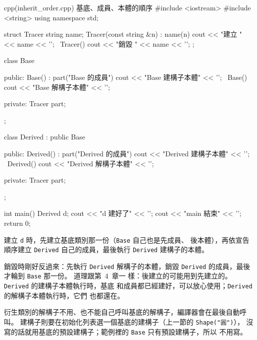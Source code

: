 \begin{example}[label=ex:inherit-order]{cpp}{(inherit\_order.cpp) 基底、成員、本體的順序}
#include <iostream>
#include <string>
using namespace std;

struct Tracer {
    string name;
    Tracer(const string &n) : name(n) { cout << "建立 " << name << '\n'; }
    ~Tracer() { cout << "銷毀 " << name << '\n'; }
};

class Base {
public:
    Base() : part("Base 的成員") { cout << "Base 建構子本體" << '\n'; }
    ~Base() { cout << "Base 解構子本體" << '\n'; }

private:
    Tracer part;
};

class Derived : public Base {
public:
    Derived() : part("Derived 的成員") { cout << "Derived 建構子本體" << '\n'; }
    ~Derived() { cout << "Derived 解構子本體" << '\n'; }

private:
    Tracer part;
};

int main() {
    {
        Derived d;
        cout << "d 建好了" << '\n';
    }
    cout << "main 結束" << '\n';
    return 0;
}
\end{example}


建立 \texttt{d} 時，先建立基底類別那一份（\texttt{Base} 自己也是先成員、
後本體），再依宣告順序建立 \texttt{Derived} 自己的成員，最後執行
\texttt{Derived} 建構子的本體。

銷毀時剛好反過來：先執行 \texttt{Derived} 解構子的本體，銷毀
\texttt{Derived} 的成員，最後才輪到 \texttt{Base} 那一份。 道理跟第~4~章一
樣：後建立的可能用到先建立的。 \texttt{Derived} 的建構子本體執行時，基底
和成員都已經建好，可以放心使用；\texttt{Derived} 的解構子本體執行時，它們
也都還在。

衍生類別的解構子不用、也不能自己呼叫基底的解構子，編譯器會在最後自動呼叫。
建構子則要在初始化列表選一個基底的建構子（上一節的 \texttt{Shape("圓")}），
沒寫的話就用基底的預設建構子；範例裡的 \texttt{Base} 只有預設建構子，所以
不用寫。

